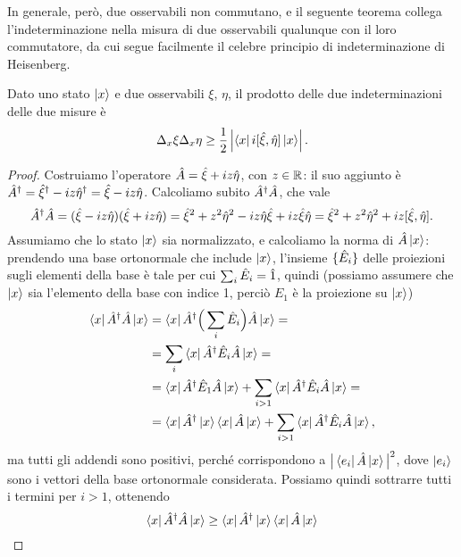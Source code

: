 In generale, però, due osservabili non commutano, e il seguente teorema collega l'indeterminazione nella misura di due osservabili qualunque con il loro commutatore, da cui segue facilmente il celebre principio di indeterminazione di Heisenberg.
\begin{teorema} \label{t:indeterminazione}
	Dato uno stato $\left|{x}\right\rangle$ e due osservabili $\xi$, $\eta$, il prodotto delle due indeterminazioni delle due misure è
	\begin{equation}
		\Delta_x\xi\Delta_x\eta\geq\frac12\left|{\left\langle{x}\right|i[\hat{\xi},\hat{\eta}]\left|{x}\right\rangle}\right|.
		\label{eq:indeterminazione}
	\end{equation}
\end{teorema}
\begin{proof}
	Costruiamo l'operatore $\hat{A}=\hat{\xi}+iz\hat{\eta}$, con $z\in\mathbb{R}$: il suo aggiunto è ${\hat{A}}^\dagger={\hat{\xi}}^\dagger-iz{\hat{\eta}}^\dagger=\hat{\xi}-iz\hat{\eta}$.
	Calcoliamo subito ${\hat{A}}^\dagger\hat{A}$, che vale
	\begin{equation}
		{\hat{A}}^\dagger\hat{A}=(\hat{\xi}-iz\hat{\eta})(\hat{\xi}+iz\hat{\eta})=\hat{\xi}^2+z^2\hat{\eta}^2-iz\hat{\eta}\hat{\xi}+iz\hat{\xi}\hat{\eta}=\hat{\xi}^2+z^2\hat{\eta}^2+iz[\hat{\xi},\hat{\eta}].
	\end{equation}
	Assumiamo che lo stato $\left|{x}\right\rangle$ sia normalizzato, e calcoliamo la norma di $\hat{A}\left|{x}\right\rangle$: prendendo una base ortonormale che include $\left|{x}\right\rangle$, l'insieme $\{\hat{E}_i\}$ delle proiezioni sugli elementi della base è tale per cui $\sum_i\hat{E}_i=\hat{1}$, quindi (possiamo assumere che $\left|{x}\right\rangle$ sia l'elemento della base con indice 1, perciò $E_1$ è la proiezione su $\left|{x}\right\rangle$)
	\begin{equation}
		\begin{split}
			\left\langle{x}\right|{\hat{A}}^\dagger\hat{A}\left|{x}\right\rangle&=\left\langle{x}\right|{\hat{A}}^\dagger\Big(\sum_i\hat{E}_i\Big)\hat{A}\left|{x}\right\rangle=\\
			&=\sum_i\left\langle{x}\right|{\hat{A}}^\dagger\hat{E}_i\hat{A}\left|{x}\right\rangle=\\
			&=\left\langle{x}\right|{\hat{A}}^\dagger\hat{E}_1\hat{A}\left|{x}\right\rangle+\sum_{i>1}\left\langle{x}\right|{\hat{A}}^\dagger\hat{E}_i\hat{A}\left|{x}\right\rangle=\\
			&=\left\langle{x}\right|{\hat{A}}^\dagger\left|{x}\right\rangle\left\langle{x}\right|\hat{A}\left|{x}\right\rangle+\sum_{i>1}\left\langle{x}\right|{\hat{A}}^\dagger\hat{E}_i\hat{A}\left|{x}\right\rangle,
		\end{split}
	\end{equation}
	ma tutti gli addendi sono positivi, perch\'e corrispondono a $\big|\left\langle{e_i}\right|\hat{A}\left|{x}\right\rangle\big|^2$, dove $\left|{e_i}\right\rangle$ sono i vettori della base ortonormale considerata.
	Possiamo quindi sottrarre tutti i termini per $i>1$, ottenendo
	\begin{equation}
		\bra{x}\adj{\op A}\op A\ket{x}\geq\bra{x}\adj{\op A}\ket{x}\bra{x}\op A\ket{x}

\end{equation}
\end{proof}
